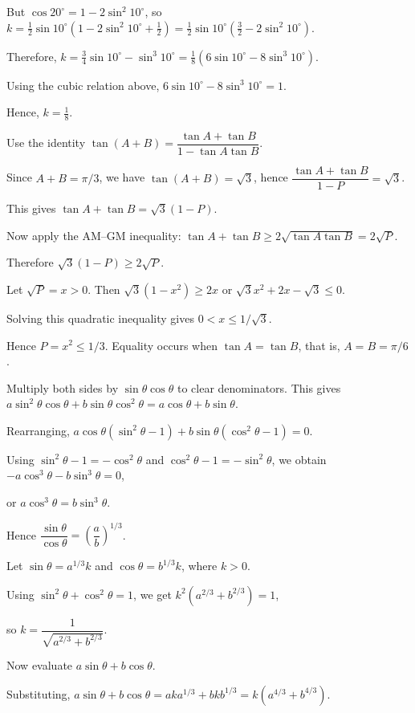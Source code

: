   But $\cos20^\circ=1-2\sin^2 10^\circ$, so $k = \frac12\sin10^\circ\left(1-2\sin^2 10^\circ+\frac12\right)
  = \frac12\sin10^\circ\left(\frac32-2\sin^2 10^\circ\right)$.

  Therefore, $k=\frac34\sin10^\circ-\sin^3 10^\circ = \frac18(6\sin10^\circ-8\sin^3 10^\circ)$.

  Using the cubic relation above, $6\sin10^\circ-8\sin^3 10^\circ=1$.

  Hence, $k=\frac18$.
\item Use the identity $\tan(A+B)=\dfrac{\tan A+\tan B}{1-\tan A\tan B}$.

  Since $A+B=\pi/3$, we have $\tan(A+B)=\sqrt3$, hence $\dfrac{\tan A+\tan B}{1-P}=\sqrt3$.

  This gives $\tan A+\tan B=\sqrt3(1-P)$.

  Now apply the AM–GM inequality: $\tan A+\tan B \ge 2\sqrt{\tan A\tan B}=2\sqrt P$.

  Therefore $\sqrt3(1-P)\ge 2\sqrt P$.

  Let $\sqrt P=x>0$. Then $\sqrt3(1-x^2)\ge 2x$ or $\sqrt3 x^2+2x-\sqrt3\le 0$.

  Solving this quadratic inequality gives $0<x\le 1/\sqrt3$.

  Hence $P=x^2\le 1/3$. Equality occurs when $\tan A=\tan B$, that is, $A=B=\pi/6$.
\item Multiply both sides by $\sin\theta\cos\theta$ to clear denominators. This gives
  $a\sin^2\theta\cos\theta+b\sin\theta\cos^2\theta=a\cos\theta+b\sin\theta$.

  Rearranging, $a\cos\theta(\sin^2\theta-1)+b\sin\theta(\cos^2\theta-1)=0$.

  Using $\sin^2\theta-1=-\cos^2\theta$ and $\cos^2\theta-1=-\sin^2\theta$, we obtain
  $-a\cos^3\theta-b\sin^3\theta=0$,

  or $a\cos^3\theta=b\sin^3\theta$.

  Hence $\dfrac{\sin\theta}{\cos\theta}=\left(\dfrac{a}{b}\right)^{1/3}$.

  Let $\sin\theta=a^{1/3}k$ and $\cos\theta=b^{1/3}k$, where $k>0$.

  Using $\sin^2\theta+\cos^2\theta=1$, we get $k^2(a^{2/3}+b^{2/3})=1$,

  so $k=\dfrac{1}{\sqrt{a^{2/3}+b^{2/3}}}$.

  Now evaluate $a\sin\theta+b\cos\theta$.

  Substituting, $a\sin\theta+b\cos\theta = ak a^{1/3}+bk b^{1/3} = k(a^{4/3}+b^{4/3})$.

